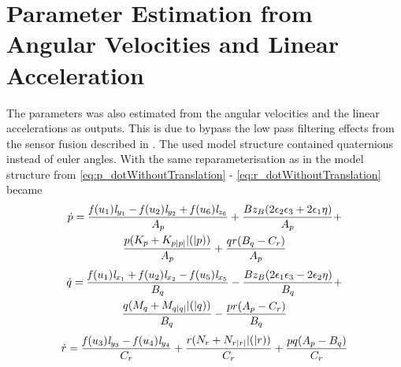 \section{Parameter Estimation from Angular Velocities and Linear Acceleration}
The parameters was also estimated from the angular velocities and the linear accelerations as outputs. This is due to bypass the low pass filtering effects from the sensor fusion described in . The used model structure contained quaternions instead of euler angles. With the same reparameterisation as in  the model structure from \eqref{eq:p_dotWithoutTranslation} - \eqref{eq:r_dotWithoutTranslation} became 
\begin{multline}
\dot{p} = \frac{\mathit{f}(u_{1}) \mathit{l}_{y_{1}} - \mathit{f}(u_{2}) \mathit{l}_{y_{2}} + \mathit{f}(u_{6}) \mathit{l}_{z_{6}}}{A_p} + \frac{B z_B (2 \epsilon_2 \epsilon_3 + 2 \epsilon_1 \eta)}{A_p} + \\ \frac{p (K_{p} + K_{p|p|} |(|p))}{A_p} + \frac{q r (B_q - C_r)}{A_p}
\end{multline}
\begin{multline}
\dot{q} = \frac{\mathit{f}(u_{1}) \mathit{l}_{x_{1}} + \mathit{f}(u_{2}) \mathit{l}_{x_{2}} - \mathit{f}(u_{5}) \mathit{l}_{x_{5}}}{B_q} - \frac{B z_B (2 \epsilon_1 \epsilon_3 - 2 \epsilon_2 \eta)}{B_q} + \\ \frac{q (M_{q} + M_{q|q|} |(|q))}{B_q} - \frac{p r (A_p - C_r)}{B_q}
\end{multline}
\begin{multline}
\dot{r} = \frac{\mathit{f}(u_{3}) \mathit{l}_{y_{3}} - \mathit{f}(u_{4}) \mathit{l}_{y_{4}}}{C_r} + \frac{r (N_{r} + N_{r|r|} |(|r))}{C_r} + \frac{p q (A_p  - B_q)}{C_r}
\end{multline}

